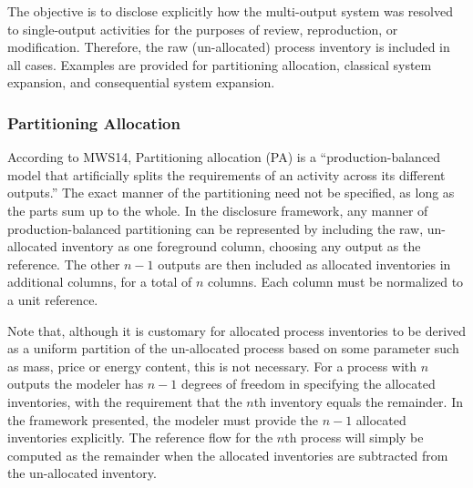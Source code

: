 The objective is to disclose explicitly how the multi-output system was resolved to single-output activities for the purposes of review, reproduction, or modification.  Therefore, the raw (un-allocated) process inventory is included in all cases.  Examples are provided for partitioning allocation, classical system expansion, and consequential system expansion.

\subsubsection{Partitioning Allocation}

According to MWS14, Partitioning allocation (PA) is a ``production-balanced model that artificially splits the requirements of an activity across its different outputs.''  The exact manner of the partitioning need not be specified, as long as the parts sum up to the whole.  In the disclosure framework, any manner of production-balanced partitioning can be represented by including the raw, un-allocated inventory as one foreground column, choosing any output as the reference.  The other $n-1$ outputs are then included as allocated inventories in additional columns, for a total of $n$ columns.  Each column must be normalized to a unit reference.

Note that, although it is customary for allocated process inventories to be derived as a uniform partition of the un-allocated process based on some parameter such as mass, price or energy content, this is not necessary.  For a process with $n$ outputs the modeler has $n-1$ degrees of freedom in specifying the allocated inventories, with the requirement that the $n$th inventory equals the remainder.  In the framework presented, the modeler must provide the $n-1$ allocated inventories explicitly.  The reference flow for the $n$th process will simply be computed as the remainder when the allocated inventories are subtracted from the un-allocated inventory.

